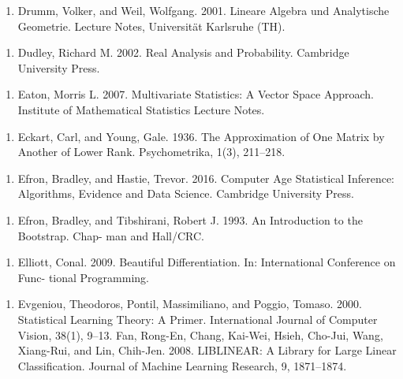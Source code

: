 \begin{enumerate}
\item Drumm, Volker, and Weil, Wolfgang. 2001. Lineare Algebra und Analytische Geometrie. Lecture Notes, Universität Karlsruhe (TH).
\end{enumerate}

\begin{enumerate}
\item Dudley, Richard M. 2002. Real Analysis and Probability. Cambridge University Press.
\end{enumerate}

\begin{enumerate}
\item Eaton, Morris L. 2007. Multivariate Statistics: A Vector Space Approach. Institute of Mathematical Statistics Lecture Notes.
\end{enumerate}

\begin{enumerate}
\item Eckart, Carl, and Young, Gale. 1936. The Approximation of One Matrix by Another of Lower Rank. Psychometrika, 1(3), 211–218.
\end{enumerate}

\begin{enumerate}
\item Efron, Bradley, and Hastie, Trevor. 2016. Computer Age Statistical Inference: Algorithms, Evidence and Data Science. Cambridge University Press.
\end{enumerate}

\begin{enumerate}
\item Efron, Bradley, and Tibshirani, Robert J. 1993. An Introduction to the Bootstrap. Chap- man and Hall/CRC.
\end{enumerate}

\begin{enumerate}
\item Elliott, Conal. 2009. Beautiful Differentiation. In: International Conference on Func- tional Programming.
\end{enumerate}

\begin{enumerate}
\item Evgeniou, Theodoros, Pontil, Massimiliano, and Poggio, Tomaso. 2000. Statistical Learning Theory: A Primer. International Journal of Computer Vision, 38(1), 9–13. Fan, Rong-En, Chang, Kai-Wei, Hsieh, Cho-Jui, Wang, Xiang-Rui, and Lin, Chih-Jen. 2008. LIBLINEAR: A Library for Large Linear Classiﬁcation. Journal of Machine Learning Research, 9, 1871–1874.
\end{enumerate}


